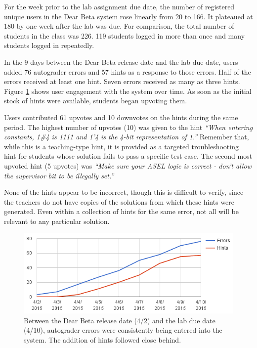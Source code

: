 For the week prior to the lab assignment due date, the number of registered unique users in the Dear Beta system rose linearly from 20 to 166. It plateaued at 180 by one week after the lab was due. For comparison, the total number of students in the class was 226. 119 students logged in more than once and many students logged in repeatedly.

In the 9 days between the Dear Beta release date and the lab due date, users added 76 autograder errors and 57 hints as a response to those errors. Half of the errors received at least one hint. Seven errors received as many as three hints. Figure \ref{fig:betaengagement} shows user engagement with the system over time. As soon as the initial stock of hints were available, students began upvoting them.

Users contributed 61 upvotes and 10 downvotes on the hints during the same period. The highest number of upvotes (10) was given to the hint {\it ``When entering constants, 1\#4 is 1111 and 1'4 is the 4-bit representation of 1.''} Remember that, while this is a teaching-type hint, it is provided as a targeted troubleshooting hint for students whose solution fails to pass a specific test case. The second most upvoted hint (5 upvotes) was {\it ``Make sure your ASEL logic is correct - don't allow the supervisor bit to be illegally set.''} 

None of the hints appear to be incorrect, though this is difficult to verify, since the teachers do not have copies of the solutions from which these hints were generated. Even within a collection of hints for the same error, not all will be relevant to any particular solution.


\begin{figure}
\centering
\includegraphics[width=1.0\columnwidth]{Body/figures/classoverflow/cumulativeErrorsAndHints.png}
\caption{Between the Dear Beta release date (4/2) and the lab due date (4/10), autograder errors were consistently being entered into the system. The addition of hints followed close behind.}
\label{fig:betaengagement}
\end{figure}


